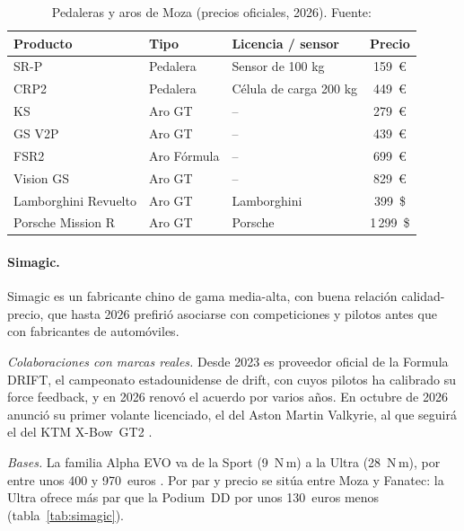 \begin{table}[htbp]
	\centering
	\caption[Pedaleras y aros de Moza (precios oficiales, 2026)]{Pedaleras y aros de Moza (precios oficiales, 2026). Fuente: \parencite{moza_web}}
	\label{tab:moza-pedales-aros}
	\small
	\begin{tabular}{|l|l|l|c|}
		\hline
		\textbf{Producto} & \textbf{Tipo} & \textbf{Licencia / sensor} & \textbf{Precio} \\
		\hline
		SR-P               & Pedalera     & Sensor de 100 kg        & 159~\euro \\
		CRP2               & Pedalera     & Célula de carga 200 kg  & 449~\euro \\
		KS                 & Aro GT       & --                      & 279~\euro \\
		GS V2P             & Aro GT       & --                      & 439~\euro \\
		FSR2               & Aro Fórmula  & --                      & 699~\euro \\
		Vision GS          & Aro GT       & --                      & 829~\euro \\
		Lamborghini Revuelto & Aro GT     & Lamborghini             & 399~\$ \\
		Porsche Mission R  & Aro GT       & Porsche                 & 1\,299~\$ \\
		\hline
	\end{tabular}
\end{table}

\paragraph{Simagic.}
Simagic es un fabricante chino de gama media-alta, con buena relación calidad-precio, que hasta 2026 prefirió asociarse con competiciones y pilotos antes que con fabricantes de automóviles.

\textit{Colaboraciones con marcas reales.} Desde 2023 es proveedor oficial de la Formula DRIFT, el campeonato estadounidense de drift, con cuyos pilotos ha calibrado su force feedback, y en 2026 renovó el acuerdo por varios años. En octubre de 2026 anunció su primer volante licenciado, el del Aston Martin Valkyrie, al que seguirá el del KTM X-Bow~GT2 \parencite{simagic_web}.

\textit{Bases.} La familia Alpha EVO va de la Sport (9~N\,m) a la Ultra (28~N\,m), por entre unos 400 y 970~euros \parencite{simagic_web}. Por par y precio se sitúa entre Moza y Fanatec: la Ultra ofrece más par que la Podium~DD por unos 130~euros menos (tabla~\ref{tab:simagic}).

